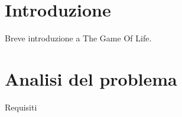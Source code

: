 \documentclass[12pt,a4paper,openright,oneside]{report}
\begin{document}
\begin{titlepage}                       %
%
\newpage                                %
%
\clearpage{\pagestyle{empty}\cleardoublepage}%
\end{titlepage}
\tableofcontents                        %
\clearpage{\pagestyle{empty}\cleardoublepage}
\listoffigures                          %
\clearpage{\pagestyle{empty}\cleardoublepage}
\listoftables                           %
\clearpage{\pagestyle{empty}\cleardoublepage}
\lstlistoflistings						%
\clearpage{\pagestyle{empty}\cleardoublepage}
\chapter*{Introduzione}                 %
Breve introduzione a The Game Of Life.
\clearpage{\pagestyle{empty}\cleardoublepage}
\chapter{Analisi del problema}           %
\lhead[\fancyplain{}{\bfseries\thepage}]{\fancyplain{}{\bfseries\rightmark}}
Requisiti
\clearpage{\pagestyle{empty}\cleardoublepage}
\end{document}
